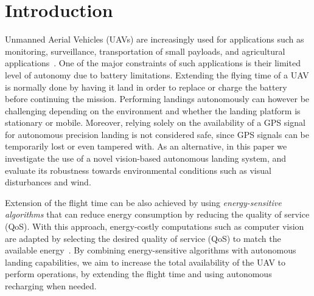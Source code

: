 \documentclass[conference]{IEEEtran}
\begin{document}
%
\IEEEpeerreviewmaketitle

\section{Introduction}
\label{sec:introduction}

Unmanned Aerial Vehicles (UAVs) are increasingly used for applications
such as monitoring, surveillance, transportation of small payloads,
and agricultural applications~\cite{costa2012use,salami2014uav}.
%
One of the major constraints of such applications is their limited level of autonomy due to battery limitations. %
%
Extending the flying time of a UAV is normally done by having it land
in order to replace or charge the battery before continuing the
mission. Performing landings autonomously can however be challenging
depending on the environment and whether the landing platform is
stationary or mobile.
%
%
Moreover, relying solely on the availability of a GPS signal for
autonomous precision landing is not considered safe, since GPS signals
can be temporarily lost or even tampered with.
%
%
As an alternative, in this paper we investigate the use of a novel
vision-based autonomous landing system, and evaluate its robustness
towards environmental conditions such as visual disturbances and wind.
%

Extension of the flight time can be also achieved by using
\emph{energy-sensitive algorithms} that can reduce energy consumption
by reducing the quality of service (QoS). With this approach,
energy-costly computations such as computer vision are adapted by
selecting the desired quality of service (QoS) to match the available
energy~\cite{seewald2020mechanical}.
%
%
By combining energy-sensitive algorithms with autonomous landing
capabilities, we aim to increase the total availability of the UAV to
perform operations, by extending the flight time and using autonomous
recharging when needed.
%
\end{document}
